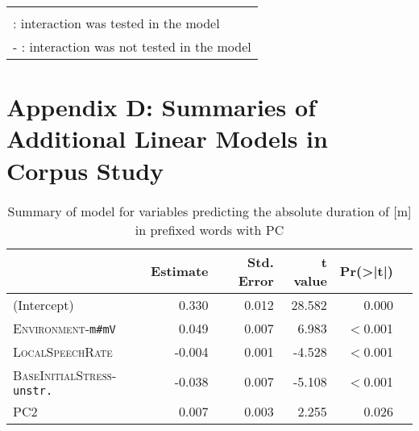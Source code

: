 \begin{table}[H]
\begin{center}
{\begin{tabular}{lrrrrr}
		\hline\\
						\multicolumn{6}{l}{\small \checkmark \hspace*{0.2cm}: interaction was tested in the model} \\			
						\multicolumn{6}{l}{\small - \hspace*{0.45cm}: interaction was not tested in the model} \\			
		
			\end{tabular}
}
\end{center}
\end{table}



\clearpage

\section*{Appendix D: Summaries of Additional Linear Models in Corpus Study}\label{Appendix D: model summaries corpus}


\begin{table}[H]
	\centering
	\caption{ Summary of model for variables predicting the absolute duration of [m] in prefixed words with PC}
	\label{model im PC Corpus abs}

	\begin{tabular}{lrrrrr}
		\hline
		& Estimate                       & Std. Error            & t value & Pr(\textgreater|t|)  \\ \hline
(Intercept) & 0.330 & 0.012 & 28.582 & 0.000 \\ 
\textsc{Environment}-\texttt{m\#mV}& 0.049 & 0.007 & 6.983 & $<$0.001\\ 
\textsc{LocalSpeechRate }& -0.004 & 0.001 & -4.528 & $<$0.001\\ 
\textsc{BaseInitialStress}-\texttt{unstr.} & -0.038 & 0.007 & -5.108 &  $<$0.001 \\ 
\textsc{PC2 }& 0.007 & 0.003 & 2.255 & 0.026 \\
		\hline	
	\end{tabular}
\end{table}



